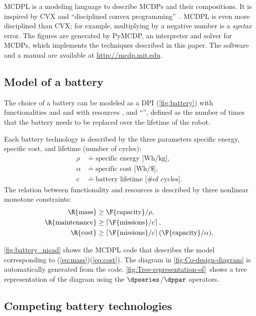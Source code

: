 MCDPL is a modeling language to describe MCDPs and their compositions.
It is inspired by CVX and ``disciplined convex programming''~\cite{grant08graph}.
MCDPL is even more disciplined than CVX; for example, multiplying
by a negative number is a \emph{syntax} error. The figures are generated
by PyMCDP, an interpreter and solver for MCDPs, which implements the
techniques described in this paper. The software and a manual are
available at \url{http://mcdp.mit.edu}.

\subsection{Model of a battery}

The choice of a battery can be modeled as a DPI (\cref{fig:battery})
with functionalities  and 
and with resources ,  and ``'',
defined as the number of times that the battery needs to be replaced
over the lifetime of the robot.

Each battery technology is described by the three parameters specific
energy, specific cost, and lifetime (number of cycles):
\begin{align*}
  \rho & \doteq\text{specific energy [Wh/kg]},\\
  \alpha & \doteq\text{specific cost [Wh/\$]},\\
  c & \doteq\text{battery lifetime [\# of cycles]}.
\end{align*}
The relation between functionality and resources is described by three
nonlinear monotone constraints:
\begin{align}
  \R{\text{mass}} & \geq\F{\text{capacity}}/\rho,\label{eq:mass}\\
  \R{\text{maintenance}} & \geq\left\lceil \F{\text{missions}}/c\right\rceil ,\label{eq:maintenance}\\
  \R{\text{cost}} & \geq\left\lceil \F{\text{missions}}/c\right\rceil (\F{\text{capacity}}/\alpha).\label{eq:cost}
\end{align}

\cref{fig:battery_nicad} shows the MCDPL code that describes the
model corresponding to (\ref{eq:mass})\textendash (\ref{eq:cost}).
The diagram in \cref{fig:Co-design-diagram} is automatically generated
from the code. \cref{fig:Tree-representation-of}~shows a tree representation
of the diagram using the $\dpseries$/$\dppar$ operators.

\subsection{Competing battery technologies}

